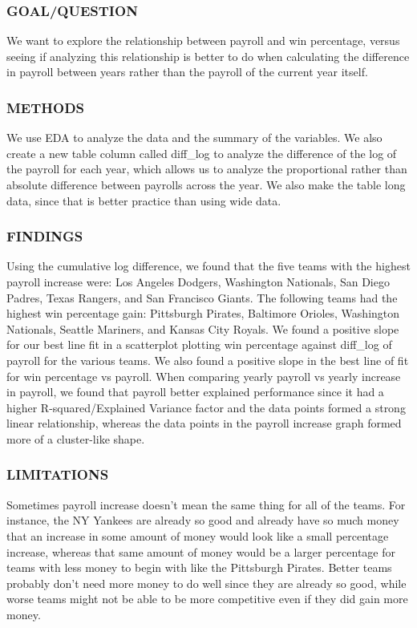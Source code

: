\documentclass[
]{article}
\begin{document}
\hypertarget{goalquestion}{%
\subsubsection{GOAL/QUESTION}\label{goalquestion}}

We want to explore the relationship between payroll and win percentage,
versus seeing if analyzing this relationship is better to do when
calculating the difference in payroll between years rather than the
payroll of the current year itself.

\hypertarget{methods}{%
\subsubsection{METHODS}\label{methods}}

We use EDA to analyze the data and the summary of the variables. We also
create a new table column called diff\_log to analyze the difference of
the log of the payroll for each year, which allows us to analyze the
proportional rather than absolute difference between payrolls across the
year. We also make the table long data, since that is better practice
than using wide data.

\hypertarget{findings-1}{%
\subsubsection{FINDINGS}\label{findings-1}}

Using the cumulative log difference, we found that the five teams with
the highest payroll increase were: Los Angeles Dodgers, Washington
Nationals, San Diego Padres, Texas Rangers, and San Francisco Giants.
The following teams had the highest win percentage gain: Pittsburgh
Pirates, Baltimore Orioles, Washington Nationals, Seattle Mariners, and
Kansas City Royals. We found a positive slope for our best line fit in a
scatterplot plotting win percentage against diff\_log of payroll for the
various teams. We also found a positive slope in the best line of fit
for win percentage vs payroll. When comparing yearly payroll vs yearly
increase in payroll, we found that payroll better explained performance
since it had a higher R-squared/Explained Variance factor and the data
points formed a strong linear relationship, whereas the data points in
the payroll increase graph formed more of a cluster-like shape.

\hypertarget{limitations}{%
\subsubsection{LIMITATIONS}\label{limitations}}

Sometimes payroll increase doesn't mean the same thing for all of the
teams. For instance, the NY Yankees are already so good and already have
so much money that an increase in some amount of money would look like a
small percentage increase, whereas that same amount of money would be a
larger percentage for teams with less money to begin with like the
Pittsburgh Pirates. Better teams probably don't need more money to do
well since they are already so good, while worse teams might not be able
to be more competitive even if they did gain more money.
\end{document}
